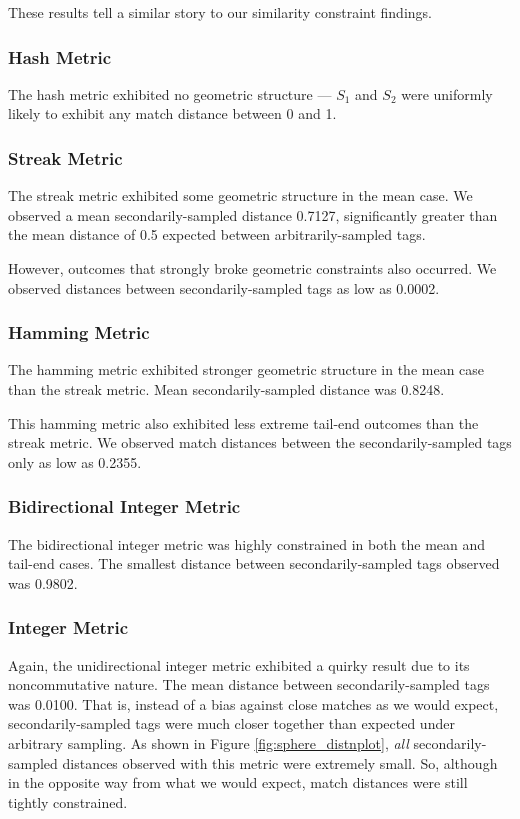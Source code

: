 These results tell a similar story to our similarity constraint findings.

\subsubsection{Hash Metric}
The hash metric exhibited no geometric structure --- $S_1$ and $S_2$ were uniformly likely to exhibit any match distance between 0 and 1.

\subsubsection{Streak Metric}

The streak metric exhibited some geometric structure in the mean case. We observed a mean secondarily-sampled distance 0.7127, significantly greater than the mean distance of 0.5 expected between arbitrarily-sampled tags.

However, outcomes that strongly broke geometric constraints also occurred.
We observed distances between secondarily-sampled tags as low as 0.0002.

\subsubsection{Hamming Metric}

The hamming metric exhibited stronger geometric structure in the mean case than the streak metric.
Mean secondarily-sampled distance was 0.8248.

This hamming metric also exhibited less extreme tail-end outcomes than the streak metric.
We observed match distances between the secondarily-sampled tags only as low as 0.2355.

\subsubsection{Bidirectional Integer Metric}

The bidirectional integer metric was highly constrained in both the mean and tail-end cases.
The smallest distance between secondarily-sampled tags observed was 0.9802.

\subsubsection{Integer Metric}

Again, the unidirectional integer metric exhibited a quirky result due to its noncommutative nature.
The mean distance between secondarily-sampled tags was 0.0100.
That is, instead of a bias against close matches as we would expect, secondarily-sampled tags were much closer together than expected under arbitrary sampling.
As shown in Figure \ref{fig:sphere_distnplot}, \textit{all} secondarily-sampled distances observed with this metric were extremely small.
So, although in the opposite way from what we would expect, match distances were still tightly constrained.

